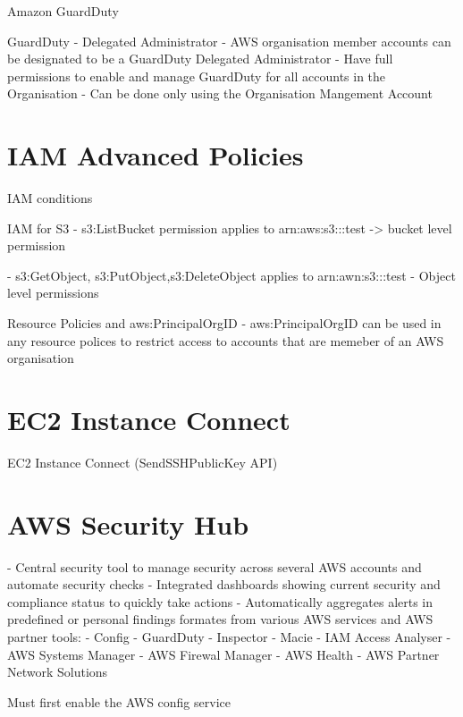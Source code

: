 \documentclass[11pt]{book}
\begin{document}
    Amazon GuardDuty

    GuardDuty - Delegated Administrator
    - AWS organisation member accounts can be designated to be a GuardDuty Delegated Administrator
    - Have full permissions to enable and manage GuardDuty for all accounts in the Organisation
    - Can be done only using the Organisation Mangement Account

    \section{IAM Advanced Policies}
    IAM conditions


    IAM for S3
    - s3:ListBucket permission applies to arn:aws:s3:::test -> bucket level permission

    - s3:GetObject, s3:PutObject,s3:DeleteObject applies to arn:awn:s3:::test
    - Object level permissions

    Resource Policies and aws:PrincipalOrgID
    - aws:PrincipalOrgID can be used in any resource polices to restrict access to accounts that are memeber of an AWS organisation

    \section{EC2 Instance Connect}
    EC2 Instance Connect (SendSSHPublicKey API)

    \section{AWS Security Hub}
    - Central security tool to manage security across several AWS accounts and automate security checks
    - Integrated dashboards showing current security and compliance status to quickly take actions
    - Automatically aggregates alerts in predefined or personal findings formates from various AWS services and AWS partner tools:
        - Config
        - GuardDuty
        - Inspector
        - Macie
        - IAM Access Analyser
        - AWS Systems Manager
        - AWS Firewal Manager
        - AWS Health
        - AWS Partner Network Solutions

    Must first enable the AWS config service
\end{document}
